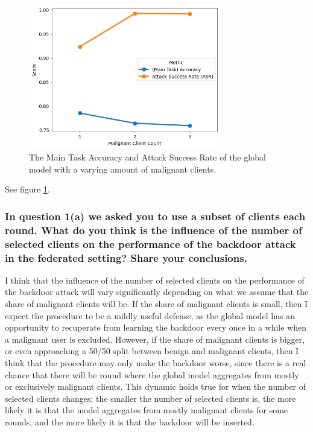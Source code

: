 \documentclass{article}
\begin{document}
\begin{figure}[h]
    \centering
    \includegraphics[width=0.75\textwidth]{malignant_client_count.png}
    \caption{The Main Task Accuracy and Attack Success Rate of the global model with a varying amount of malignant clients.}
    \label{fig:malignant_client_count}
\end{figure}

See figure \ref{fig:malignant_client_count}.

\subsubsection{In question 1(a) we asked you to use a subset of clients each round.
What do you think is the influence of the number of selected clients on the
performance of the backdoor attack in the federated setting? Share your conclusions.}
I think that the influence of the number of selected clients on the performance of the backdoor attack will vary significantly depending on what we assume that the share of malignant clients will be.
If the share of malignant clients is small, then I expect the procedure to be a mildly useful defense, as the global model has an opportunity to recuperate from learning the backdoor every once in a while when a malignant user is excluded.
However, if the share of malignant clients is bigger, or even approaching a 50/50 split between benign and malignant clients, then I think that the procedure may only make the backdoor worse, since there is a real chance that there will be round where the global model aggregates from mostly or exclusively malignant clients.
This dynamic holds true for when the number of selected clients changes: the smaller the number of selected clients is, the more likely it is that the model aggregates from mostly malignant clients for some rounds, and the more likely it is that the backdoor will be inserted.
\end{document}
